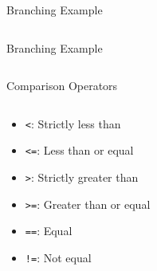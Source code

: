         \begin{frame}{Branching Example}
            \LARGE
            \inputminted[frame=single,framesep=2pt]{python3}{code-examples/branching_example.py}
        \end{frame}

        \begin{frame}{Branching Example}
            \LARGE
            \inputminted[frame=single,framesep=2pt]{python3}{code-examples/branching_example2.py}
        \end{frame}

        \begin{frame}{Comparison Operators}
            \LARGE
            \begin{columns}
                \begin{column}{0.4\textwidth}
                    \begin{itemize}
                        \item \texttt{<}: Strictly less than
                        \item \texttt{<=}: Less than or equal
                        \item \texttt{>}: Strictly greater than
                        \item \texttt{>=}: Greater than or equal
                        \item \texttt{==}: Equal
                        \item \texttt{!=}: Not equal
                    \end{itemize}
                \end{column}
                \begin{column}{0.6\textwidth}
                    \inputminted[frame=single,framesep=2pt]{python3}{../Lecture2/code-examples/comparison.py}
                \end{column}
            \end{columns}
        \end{frame}

